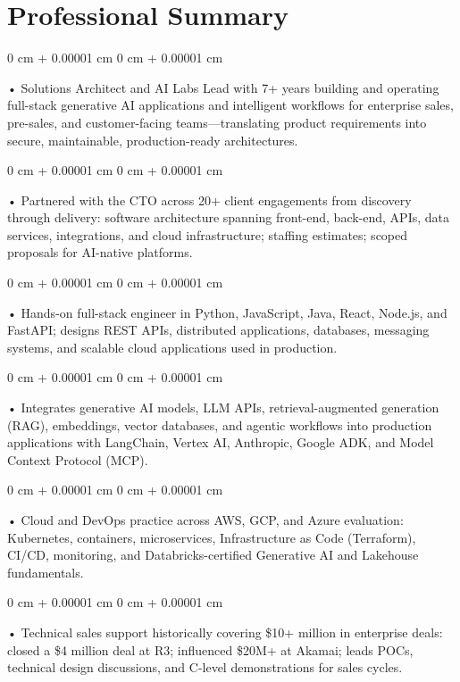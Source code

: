 \documentclass[10pt, letterpaper]{article}
\newenvironment{onecolentry}{
    \begin{adjustwidth}{
        0 cm + 0.00001 cm
    }{
        0 cm + 0.00001 cm
    }
}{
    \end{adjustwidth}
} %
\begin{document}
    \section{Professional Summary}
        \vspace{2 pt }
        \begin{onecolentry}
            • Solutions Architect and AI Labs Lead with 7+ years building and operating full-stack generative AI applications and intelligent workflows for enterprise sales, pre-sales, and customer-facing teams---translating product requirements into secure, maintainable, production-ready architectures.
        \end{onecolentry}
        \begin{onecolentry}
            • Partnered with the CTO across 20+ client engagements from discovery through delivery: software architecture spanning front-end, back-end, APIs, data services, integrations, and cloud infrastructure; staffing estimates; scoped proposals for AI-native platforms.
        \end{onecolentry}
        \begin{onecolentry}
            • Hands-on full-stack engineer in Python, JavaScript, Java, React, Node.js, and FastAPI; designs REST APIs, distributed applications, databases, messaging systems, and scalable cloud applications used in production.
        \end{onecolentry}
        \begin{onecolentry}
            • Integrates generative AI models, LLM APIs, retrieval-augmented generation (RAG), embeddings, vector databases, and agentic workflows into production applications with LangChain, Vertex AI, Anthropic, Google ADK, and Model Context Protocol (MCP).
        \end{onecolentry}
        \begin{onecolentry}
            • Cloud and DevOps practice across AWS, GCP, and Azure evaluation: Kubernetes, containers, microservices, Infrastructure as Code (Terraform), CI/CD, monitoring, and Databricks-certified Generative AI and Lakehouse fundamentals.
        \end{onecolentry}
        \begin{onecolentry}
            • Technical sales support historically covering \$10+ million in enterprise deals: closed a \$4 million deal at R3; influenced \$20M+ at Akamai; leads POCs, technical design discussions, and C-level demonstrations for sales cycles.
        \end{onecolentry}
\end{document}
